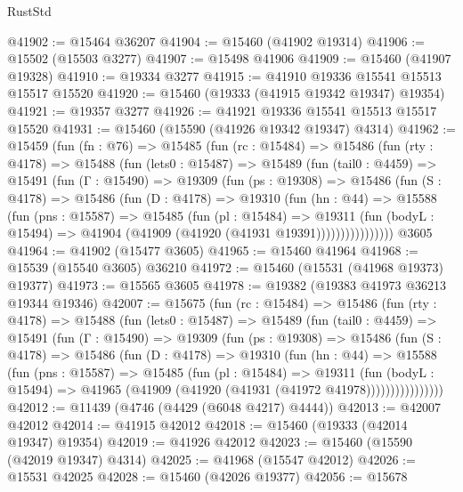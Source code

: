 \begin{lexlean}{RustStd}
\begin{coremodule}
@41902 := @15464 @36207
@41904 := @15460 (@41902 @19314)
@41906 := @15502 (@15503 @3277)
@41907 := @15498 @41906
@41909 := @15460 (@41907 @19328)
@41910 := @19334 @3277
@41915 := @41910 @19336 @15541 @15513 @15517 @15520
@41920 := @15460 (@19333 (@41915 @19342 @19347) @19354)
@41921 := @19357 @3277
@41926 := @41921 @19336 @15541 @15513 @15517 @15520
@41931 := @15460 (@15590 (@41926 @19342 @19347) @4314)
@41962 := @15459
    (fun (fn : @76) =>
    @15485
      (fun (rc : @15484) =>
      @15486
        (fun (rty : @4178) =>
        @15488
          (fun (lets0 : @15487) =>
          @15489
            (fun (tail0 : @4459) =>
            @15491
              (fun (Γ : @15490) =>
              @19309
                (fun (ps : @19308) =>
                @15486
                  (fun (S : @4178) =>
                  @15486
                    (fun (D : @4178) =>
                    @19310
                      (fun (hn : @44) =>
                      @15588
                        (fun (pns : @15587) =>
                        @15485
                          (fun (pl : @15484) =>
                          @19311
                            (fun (bodyL : @15494) =>
                            @41904 (@41909 (@41920 (@41931 @19391))))))))))))))))
    @3605
@41964 := @41902 (@15477 @3605)
@41965 := @15460 @41964
@41968 := @15539 (@15540 @3605) @36210
@41972 := @15460 (@15531 (@41968 @19373) @19377)
@41973 := @15565 @3605
@41978 := @19382 (@19383 @41973 @36213 @19344 @19346)
@42007 := @15675
    (fun (rc : @15484) =>
    @15486
      (fun (rty : @4178) =>
      @15488
        (fun (lets0 : @15487) =>
        @15489
          (fun (tail0 : @4459) =>
          @15491
            (fun (Γ : @15490) =>
            @19309
              (fun (ps : @19308) =>
              @15486
                (fun (S : @4178) =>
                @15486
                  (fun (D : @4178) =>
                  @19310
                    (fun (hn : @44) =>
                    @15588
                      (fun (pns : @15587) =>
                      @15485
                        (fun (pl : @15484) =>
                        @19311
                          (fun (bodyL : @15494) =>
                          @41965 (@41909 (@41920 (@41931 (@41972 @41978))))))))))))))))
@42012 := @11439 (@4746 (@4429 (@6048 @4217) @4444))
@42013 := @42007 @42012
@42014 := @41915 @42012
@42018 := @15460 (@19333 (@42014 @19347) @19354)
@42019 := @41926 @42012
@42023 := @15460 (@15590 (@42019 @19347) @4314)
@42025 := @41968 (@15547 @42012)
@42026 := @15531 @42025
@42028 := @15460 (@42026 @19377)
@42056 := @15678

\end{coremodule}
\end{lexlean}
